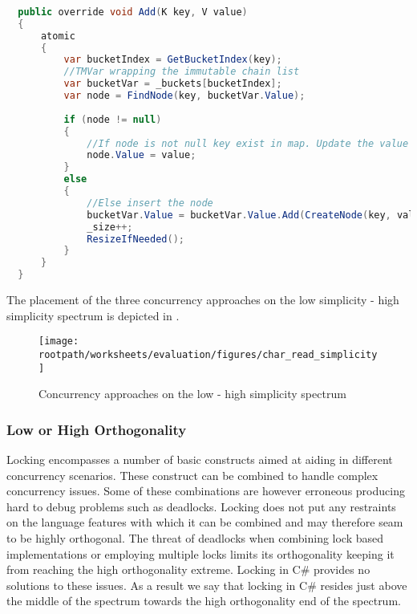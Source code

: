 \begin{lstlisting}[float,label=lst:lang_add_hashmap,
  caption={ConcurrentHashMap \bscode{Add} Method - \stmname},
  language=Java,  
  showspaces=false,
  showtabs=false,
  breaklines=true,
  showstringspaces=false,
  breakatwhitespace=true,
  escapechar=~,
  commentstyle=\color{greencomments},
  keywordstyle=\color{bluekeywords},
  stringstyle=\color{redstrings},
  morekeywords={atomic, retry, orelse, var, get, set, ref, out}]  % Start your code-block
  
  public override void Add(K key, V value)
  {
      atomic
      {
          var bucketIndex = GetBucketIndex(key);
          //TMVar wrapping the immutable chain list
          var bucketVar = _buckets[bucketIndex];
          var node = FindNode(key, bucketVar.Value);
         
          if (node != null)
          {
              //If node is not null key exist in map. Update the value
              node.Value = value;
          }
          else
          {
              //Else insert the node
              bucketVar.Value = bucketVar.Value.Add(CreateNode(key, value));
              _size++;
              ResizeIfNeeded();
          }
      }
  }
\end{lstlisting}

The placement of the three concurrency approaches on the low simplicity - high simplicity spectrum is depicted in .

\begin{figure}[htbp]
\centering
 \texttt{[image: \\rootpath/worksheets/evaluation/figures/char\_read\_simplicity]} 
 \caption{Concurrency approaches on the low - high simplicity spectrum}
\label{fig:char_simplicity}
\end{figure}
\subsubsection{Low or High Orthogonality}\label{subsec:orthogonality}
Locking encompasses a number of basic constructs aimed at aiding in different concurrency scenarios. These construct can be combined to handle complex concurrency issues. Some of these combinations are however erroneous producing hard to debug problems such as deadlocks. Locking does not put any restraints on the language features with which it can be combined and may therefore seam to be highly orthogonal. The threat  of deadlocks when combining lock based implementations or employing multiple locks limits its orthogonality keeping it from reaching the high orthogonality extreme. Locking in C\# provides no solutions to these issues. As a result we say that locking in C\# resides just above the middle of the spectrum towards the high orthogonality end of the spectrum.

